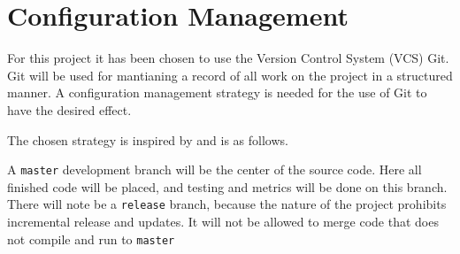 \documentclass[Main_Assignment3]{subfiles}
\begin{document}
	\section{Configuration Management} %
		\label{sec:configuration_management}
		For this project it has been chosen to use the Version Control System (VCS) Git.
		Git will be used for mantianing a record of all work on the project in a structured manner.
		A configuration management strategy is needed for the use of Git to have the desired effect.

		The chosen strategy is inspired by \cite{vincentdriessen2010} and is as follows.

		A \texttt{master} development branch will be the center of the source code. Here all finished code will be placed, and testing and metrics will be done on this branch.
		There will note be a \texttt{release} branch, because the nature of the project prohibits incremental release and updates.
		It will not be allowed to merge code that does not compile and run to \texttt{master} 



\end{document}
